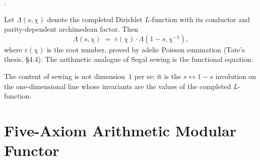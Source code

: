 \begin{theorem}
\label{v4-arith:thm:tate-functional-equation}
\ClaimStatusProvedElsewhere.

Let \(\Lambda(s,\chi)\) denote the completed Dirichlet \(L\)-function
with its conductor and parity-dependent archimedean factor. Then
\begin{equation}
\Lambda(s,\chi)\;=\;\varepsilon(\chi)\cdot\Lambda(1-s,\chi^{-1}),
\end{equation}
where \(\varepsilon(\chi)\) is the root number, proved by adelic
Poisson summation (Tate's thesis, \S4.4). The arithmetic analogue of
Segal sewing is the functional equation.
\end{theorem}

\begin{remark}
The content of sewing is not dimension~\(1\) per se; it is the
\(s\leftrightarrow 1-s\) involution on the one-dimensional line
whose invariants are the values of the completed \(L\)-function.
\end{remark}

\section{Five-Axiom Arithmetic Modular Functor}
\label{v4-arith:segal:five-axioms}

